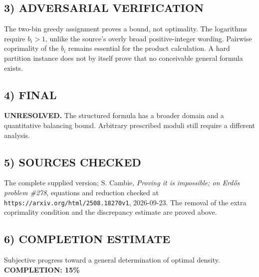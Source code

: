 \subsection*{3) ADVERSARIAL VERIFICATION}
The two-bin greedy assignment proves a bound, not optimality. The logarithms require $b_i>1$, unlike the source's overly broad positive-integer wording. Pairwise coprimality of the $b_i$ remains essential for the product calculation. A hard partition instance does not by itself prove that no conceivable general formula exists.
\subsection*{4) FINAL}
\textbf{UNRESOLVED.} The structured formula has a broader domain and a quantitative balancing bound. Arbitrary prescribed moduli still require a different analysis.
\subsection*{5) SOURCES CHECKED}
The complete supplied version; S. Cambie, \emph{Proving it is impossible; on Erd\H{o}s problem \#278}, equations and reduction checked at \texttt{https://arxiv.org/html/2508.18270v1}, 2026-09-23. The removal of the extra coprimality condition and the discrepancy estimate are proved above.
\subsection*{6) COMPLETION ESTIMATE}
Subjective progress toward a general determination of optimal density.
\textbf{COMPLETION: 15\%}
